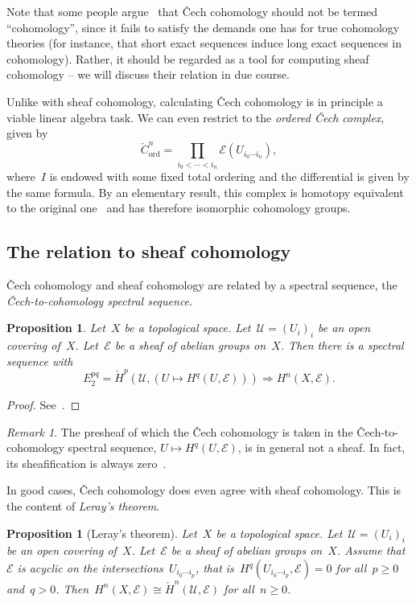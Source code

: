 \documentclass[10pt]{amsart}
\theoremstyle{definition}
\theoremstyle{plain}
\newtheorem{prop}[defn]{Proposition}
\theoremstyle{remark}
\newtheorem{rem}[defn]{Remark}
\newcommand{\E}{\mathcal{E}}
\newcommand{\U}{\mathcal{U}}
\newcommand{\stackhref}[1]{\href{http://stacks.math.columbia.edu/tag/#1}{#1}}
\begin{document}
Note that some people argue~\cite{nLab:cech} that Čech cohomology should not be
termed ``cohomology'', since it fails to satisfy the demands one has for true
cohomology theories (for instance, that short exact sequences induce long exact
sequences in cohomology). Rather, it should be regarded as a tool for computing
sheaf cohomology -- we will discuss their relation in due course.

Unlike with sheaf cohomology, calculating Čech cohomology is in principle a
viable linear algebra task. We can even restrict to the \emph{ordered Čech
complex}, given by
\[ \check C^n_{\text{ord}} = \prod_{i_0 < \cdots < i_n} \E(U_{i_0 \cdots i_n}),
\]
where~$I$ is endowed with some fixed total ordering and the differential is
given by the same formula. By an elementary result, this complex is homotopy
equivalent to the original one~\cite[Tag~\stackhref{01FG}]{stacks-project} and
has therefore isomorphic cohomology groups.


\subsection{The relation to sheaf cohomology}

Čech cohomology and sheaf cohomology are related by a spectral sequence, the
\emph{Čech-to-cohomology spectral sequence}.
\begin{prop}Let~$X$ be a topological space. Let~$\U = (U_i)_i$ be an open
covering of~$X$. Let~$\E$ be a sheaf of abelian groups on~$X$. Then there is a
spectral sequence with
\[ E_2^{pq} = \check H^p(\U, (U \mapsto H^q(U,\E))) \Longrightarrow
  H^n(X, \E). \]
\end{prop}
\begin{proof}See~\cite[Tag~\stackhref{01ES}]{stacks-project}.
\end{proof}

\begin{rem}The presheaf of which the Čech cohomology is taken in the
Čech-to-cohomology spectral sequence, $U \mapsto H^q(U,\E)$, is in general not
a sheaf. In fact, its sheafification is always
zero~\cite[Tag~\stackhref{03BA}]{stacks-project}.\end{rem}

In good cases, Čech cohomology does even agree with sheaf cohomology. This is
the content of \emph{Leray's theorem}.

\begin{prop}[Leray's theorem]Let~$X$ be a topological space. Let~$\U = (U_i)_i$ be an open
covering of~$X$. Let~$\E$ be a sheaf of abelian groups
on~$X$. Assume that~$\E$ is acyclic on the intersections~$U_{i_0 \cdots i_p}$,
that is~$H^q(U_{i_0 \cdots i_p}, \E) = 0$ for all~$p \geq 0$ and~$q > 0$.
Then~$H^n(X,\E) \cong \check H^n(\U,\E)$ for all~$n \geq 0$.\end{prop}
\end{document}
